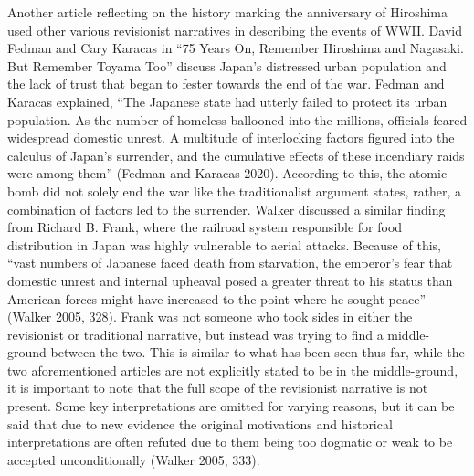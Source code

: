 \documentclass[12pt]{turabian-researchpaper}
\begin{document}
Another article reflecting on the history marking the anniversary of Hiroshima used other various revisionist narratives in describing the events of WWII. David Fedman and Cary Karacas in “75 Years On, Remember Hiroshima and Nagasaki. But Remember Toyama Too” discuss Japan’s distressed urban population and the lack of trust that began to fester towards the end of the war. Fedman and Karacas explained, “The Japanese state had utterly failed to protect its urban population. As the number of homeless ballooned into the millions, officials feared widespread domestic unrest. A multitude of interlocking factors figured into the calculus of Japan's surrender, and the cumulative effects of these incendiary raids were among them” (Fedman and Karacas 2020). According to this, the atomic bomb did not solely end the war like the traditionalist argument states, rather, a combination of factors led to the surrender. Walker discussed a similar finding from Richard B. Frank, where the railroad system responsible for food distribution in Japan was highly vulnerable to aerial attacks. Because of this, “vast numbers of Japanese faced death from starvation, the emperor’s fear that domestic unrest and internal upheaval posed a greater threat to his status than American forces might have increased to the point where he sought peace” (Walker 2005, 328). Frank was not someone who took sides in either the revisionist or traditional narrative, but instead was trying to find a middle-ground between the two. This is similar to what has been seen thus far, while the two aforementioned articles are not explicitly stated to be in the middle-ground, it is important to note that the full scope of the revisionist narrative is not present. Some key interpretations are omitted for varying reasons, but it can be said that due to new evidence the original motivations and historical interpretations are often refuted due to them being too dogmatic or weak to be accepted unconditionally (Walker 2005, 333). 
\end{document}
